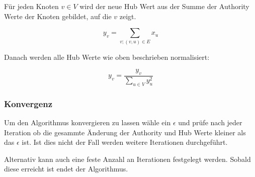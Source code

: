 Für jeden Knoten $ v \in V $ wird der neue Hub Wert aus der Summe der Authority Werte der Knoten gebildet, auf die $v$ zeigt.

\[ y_{v} = \sum_{v; (v, u) \in E} x_{u} \]

Danach werden alle Hub Werte wie oben beschrieben normalisiert:

\[ y_{v} =  \frac{y_{v}}{\sum_{u \in V} y_{u}^{2}} \]

\subsubsection{Konvergenz}

Um den Algorithmus konvergieren zu lassen wähle ein $ \epsilon $ und prüfe nach jeder Iteration ob die gesammte Änderung der Authority
und Hub Werte kleiner als das $ \epsilon $ ist. Ist dies nicht der Fall werden weitere Iterationen durchgeführt.


Alternativ kann auch eine feste Anzahl an Iterationen festgelegt werden. Sobald diese erreicht ist endet der Algorithmus.
